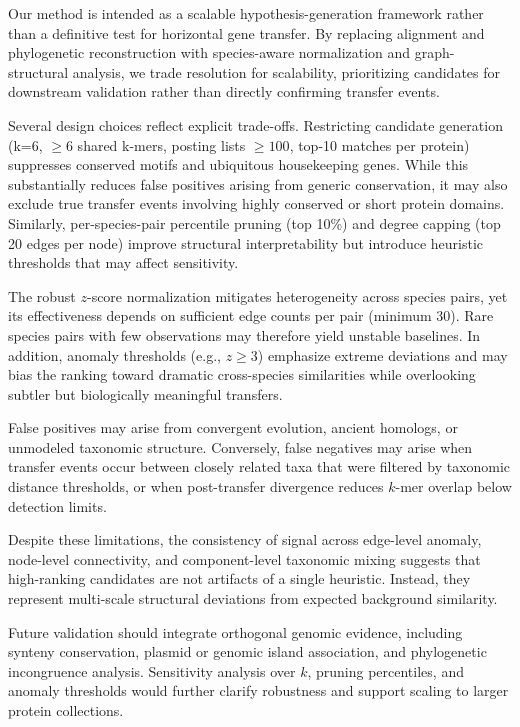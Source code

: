 \documentclass[11pt]{article}
\begin{document}
Our method is intended as a scalable hypothesis-generation framework rather than a definitive test for horizontal gene transfer. By replacing alignment and phylogenetic reconstruction with species-aware normalization and graph-structural analysis, we trade resolution for scalability, prioritizing candidates for downstream validation rather than directly confirming transfer events.

Several design choices reflect explicit trade-offs. Restricting candidate generation (k=6, $\ge6$ shared k-mers, posting lists $\ge100$, top-10 matches per protein) suppresses conserved motifs and ubiquitous housekeeping genes. While this substantially reduces false positives arising from generic conservation, it may also exclude true transfer events involving highly conserved or short protein domains. Similarly, per-species-pair percentile pruning (top 10\%) and degree capping (top 20 edges per node) improve structural interpretability but introduce heuristic thresholds that may affect sensitivity.

The robust $z$-score normalization mitigates heterogeneity across species pairs, yet its effectiveness depends on sufficient edge counts per pair (minimum 30). Rare species pairs with few observations may therefore yield unstable baselines. In addition, anomaly thresholds
(e.g., $z \ge 3$) emphasize extreme deviations and may bias the ranking toward dramatic cross-species similarities while overlooking subtler but biologically meaningful transfers.

False positives may arise from convergent evolution, ancient homologs, or unmodeled taxonomic structure. Conversely, false negatives may arise when transfer events occur between closely related taxa that were filtered by taxonomic distance thresholds, or when
post-transfer divergence reduces $k$-mer overlap below detection limits.

Despite these limitations, the consistency of signal across edge-level anomaly, node-level connectivity, and component-level taxonomic mixing suggests that high-ranking candidates are not artifacts of a single heuristic. Instead, they represent multi-scale structural deviations from expected background similarity.

Future validation should integrate orthogonal genomic evidence, including synteny conservation,
plasmid or genomic island association, and phylogenetic incongruence analysis. Sensitivity
analysis over $k$, pruning percentiles, and anomaly thresholds would further clarify robustness
and support scaling to larger protein collections.
\end{document}
